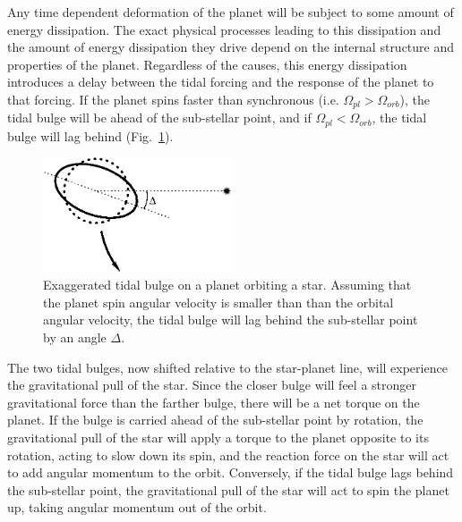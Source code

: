 Any time dependent deformation of the planet will be subject to some amount of
energy dissipation. The exact physical processes leading to this dissipation and
the amount of energy dissipation they drive depend on the internal structure and
properties of the planet. Regardless of the causes, this energy dissipation
introduces a delay between the tidal forcing and the response of the planet to
that forcing. If the planet spins faster than synchronous (i.e. $\Omega_{pl} >
\Omega_{orb}$), the tidal bulge will be ahead of the sub-stellar point, and if
$\Omega_{pl} < \Omega_{orb}$, the tidal bulge will lag behind
(Fig.~\ref{fig:tidal_bulge}).

\begin{figure}[t]
%
    \centering
%
    \includegraphics[width=0.5\textwidth]{tidal_bulge.eps}
%
    \caption{
%
        Exaggerated tidal bulge on a planet orbiting a star. Assuming that the
        planet spin angular velocity is smaller than than the orbital angular
        velocity, the tidal bulge will lag behind the sub-stellar point by an
        angle $\Delta$.
%
    }
%
    \label{fig:tidal_bulge}
%
\end{figure}

The two tidal bulges, now shifted relative to the star-planet line, will
experience the gravitational pull of the star. Since the closer bulge will feel
a stronger gravitational force than the farther bulge, there will be a net
torque on the planet. If the bulge is carried ahead of the sub-stellar point by
rotation, the gravitational pull of the star will apply a torque to the planet
opposite to its rotation, acting to slow down its spin, and the reaction force
on the star will act to add angular momentum to the orbit. Conversely, if the
tidal bulge lags behind the sub-stellar point, the gravitational pull of the
star will act to spin the planet up, taking angular momentum out of the orbit.

